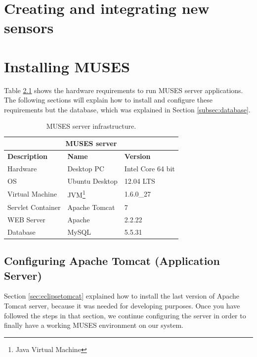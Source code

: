 \documentclass[a4paper,11pt]{book}
\begin{document}
\chapter{Creating and integrating new sensors}
\label{ch:sensors}


\chapter{Installing MUSES}
\label{ch:installmuses}

Table \ref{tab:server_infrastructure} shows the hardware requirements to run MUSES server applications. The following sections will explain how to install and configure these requirements but the database, which was explained in Section \ref{subsec:database}.

\begin{table}[!htbp]
  \caption{MUSES server infrastructure.}
  \label{tab:server_infrastructure}

  \begin{center}
    \begin{tabular}{ |l|l|l| }
    \hline
    \multicolumn{3}{|c|}{\textbf{MUSES server}} \\
    \hline
    \textbf{Description} & \textbf{Name} & \textbf{Version} \\
    \hline
    Hardware & Desktop PC & Intel Core 64 bit \\
    OS & Ubuntu Desktop & 12.04 LTS \\
    Virtual Machine & JVM\footnote{Java Virtual Machine} & 1.6.0\_27 \\
    Servlet Container & Apache Tomcat & 7 \\
    WEB Server & Apache & 2.2.22 \\
    Database & MySQL & 5.5.31 \\
    \hline
    \end{tabular}
  \end{center}
\end{table}

\section{Configuring Apache Tomcat (Application Server)}
\label{sec:tomcat}

Section \ref{sec:eclipsetomcat} explained how to install the last version of Apache Tomcat server, because it was needed for developing purposes. Once you have followed the steps in that section, we continue configuring the server in order to finally have a working MUSES environment on our system.
\end{document}

